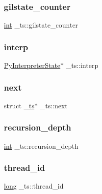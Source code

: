 \mbox{\label{struct__ts_a2a1af12986d8ab605b22d0840f2c23cf}} 
\subsubsection{\texorpdfstring{gilstate\_counter}{gilstate\_counter}}
{\footnotesize\ttfamily \mbox{\hyperlink{warnings_8h_a74f207b5aa4ba51c3a2ad59b219a423b}{int}} \+\_\+ts\+::gilstate\+\_\+counter}

\mbox{\label{struct__ts_a218498c5d2725df0a11a604c873c7af2}} 
\subsubsection{\texorpdfstring{interp}{interp}}
{\footnotesize\ttfamily \mbox{\hyperlink{pystate_8h_a7c19e387e7a6c47f2d1d639a0f741d4f}{Py\+Interpreter\+State}}$\ast$ \+\_\+ts\+::interp}

\mbox{\label{struct__ts_a07c61e6e5019334491b799a4a35a364c}} 
\subsubsection{\texorpdfstring{next}{next}}
{\footnotesize\ttfamily struct \mbox{\hyperlink{struct__ts}{\+\_\+ts}}$\ast$ \+\_\+ts\+::next}

\mbox{\label{struct__ts_a6b8d0637b018eecff79f70a6e23292ac}} 
\subsubsection{\texorpdfstring{recursion\_depth}{recursion\_depth}}
{\footnotesize\ttfamily \mbox{\hyperlink{warnings_8h_a74f207b5aa4ba51c3a2ad59b219a423b}{int}} \+\_\+ts\+::recursion\+\_\+depth}

\mbox{\label{struct__ts_a8232b11c626b661c1d69560e0b562e7d}} 
\subsubsection{\texorpdfstring{thread\_id}{thread\_id}}
{\footnotesize\ttfamily \mbox{\hyperlink{modsupport_8h_a0cb68e00fb9fb1260ee2daadd9fe6611}{long}} \+\_\+ts\+::thread\+\_\+id}

